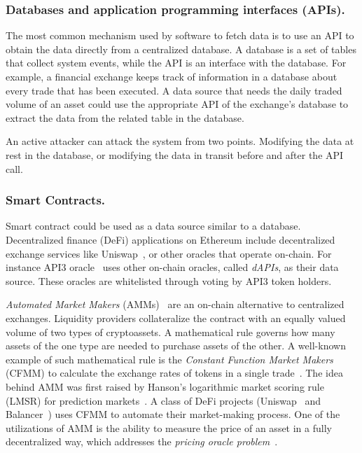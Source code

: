 \subsubsection{Databases and application programming interfaces (APIs).} %

The most common mechanism used by software to fetch data is to use an API to obtain the data directly from a centralized database. A database is a set of tables that collect system events, while the API is an interface with the database. For example, a financial exchange keeps track of information in a database about every trade that has been executed. A data source that needs the daily traded volume of an asset could use the appropriate API of the exchange's database to extract the data from the related table in the database.

An active attacker can attack the system from two points. Modifying the data at rest in the database, or modifying the data in transit before and after the API call. 

\subsubsection{Smart Contracts.}

Smart contract could be used as a data source similar to a database. Decentralized finance (DeFi) applications on Ethereum include decentralized exchange services like Uniswap~\cite{adams2019uniswap}, or other oracles that operate on-chain. For instance API3 oracle~\cite{benligiraydecentralized} uses other on-chain oracles, called \textit{dAPIs}, as their data source. These oracles are whitelisted through voting by API3 token holders.

\textit{Automated Market Makers} (AMMs)~\cite{wang2020automated} are an on-chain alternative to centralized exchanges. Liquidity providers collateralize the contract with an equally valued volume of two types of cryptoassets. A mathematical rule governs how many assets of the one type are needed to purchase assets of the other. A well-known example of such mathematical rule is the \textit{Constant Function Market Makers} (CFMM) to calculate the exchange rates of tokens in a single trade~\cite{uniswapexplained}. The idea behind AMM was first raised by Hanson's logarithmic market scoring rule (LMSR) for prediction markets~\cite{hanson2003combinatorial}. A class of DeFi projects (\eg Uniswap~\cite{adams2019uniswap,adams2021uniswap} and Balancer~\cite{balancer}) uses CFMM to automate their market-making process. One of the utilizations of AMM is the ability to measure the price of an asset in a fully decentralized way, which addresses the \textit{pricing oracle problem}~\cite{angeris2020improved}.


